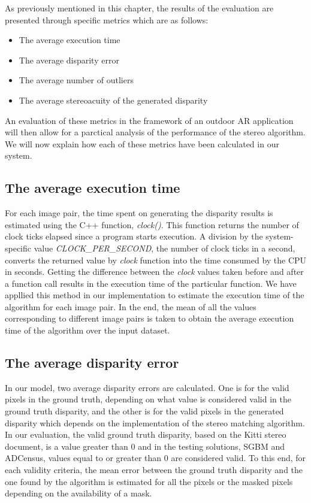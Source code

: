 As previously mentioned in this chapter, the results of the evaluation are presented through specific metrics which are as follows:

\begin{itemize}
\item{The average execution time}
\item{The average disparity error}
\item{The average number of outliers}
\item{The average stereoacuity of the generated disparity}
\end{itemize}

An evaluation of these metrics in the framework of an outdoor AR application will then allow for a parctical analysis of the performance of the stereo algorithm.
We will now explain how each of these metrics have been calculated in our system.

\subsection{The average execution time}
For each image pair, the time spent on generating the disparity results is estimated using the C++ function, \textit{clock()}. 
This function returns the number of clock ticks elapsed
since a program starts execution. A division by the system-specific value \textit{CLOCK\_PER\_SECOND}, the number of clock ticks in a second, 
converts the returned value by \textit{clock} function into the time consumed by the CPU in seconds.
Getting the difference between the \textit{clock} values taken before and after a function call results in the execution time
of the particular function. 
We have appllied this method in our implementation to estimate the execution time of the algorithm for each image pair. In the end, the mean of all
the values corresponding to different image pairs is taken to obtain the average execution time of the algorithm over the input dataset.

\subsection{The average disparity error}
In our model, two average disparity errors are calculated. One is for the valid pixels in the ground truth, depending on what value is considered valid
in the ground truth disparity, and the other is for
the valid pixels in the generated disparity which depends on the implementation of the stereo matching algorithm.
In our evaluation, the valid ground truth disparity, based on the Kitti stereo document, is a value greater than 0 and in the testing solutions, SGBM and ADCensus, 
values equal to or greater than 0 are considered valid.
To this end, for each validity criteria, the mean error between the ground truth disparity and the one found by the algorithm
is estimated for all the pixels or the masked pixels depending on the availability of a mask.  

